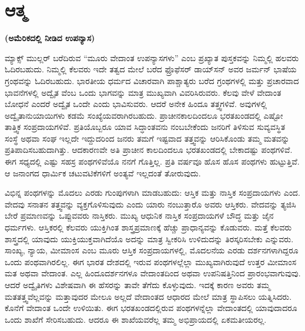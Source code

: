 \chapter{ಆತ್ಮ}

\centerline{\textbf{(ಅಮೆರಿಕದಲ್ಲಿ ನೀಡಿದ ಉಪನ್ಯಾಸ)}}

ಮ್ಯಾಕ್ಸ್​ ಮುಲ್ಲರ್​ ಬರೆದಿರುವ “ಮೂರು ವೇದಾಂತ ಉಪನ್ಯಾಸಗಳು” ಎಂಬ ಪ್ರಖ್ಯಾತ ಪುಸ್ತಕವನ್ನು ನಿಮ್ಮಲ್ಲಿ ಹಲವರು ಓದಿರಬಹುದು. ನಿಮ್ಮಲ್ಲಿ ಕೆಲವರು ಇದೇ ತತ್ವದ ಮೇಲೆ ಬರೆದ ಫ್ರೊಫೆಸರ್​ ಡಾಯ್​ಸನ್​ ಅವರ ಜರ್ಮನ್​ ಭಾಷೆಯ ಗ್ರಂಥವನ್ನು ಓದಿರಬಹುದು. ಭಾರತೀಯ ಧರ್ಮದ ವಿಚಾರವಾಗಿ ಪಾಶ್ಚಾತ್ಯರು ಬರೆದ ಗ್ರಂಥಗಳಲ್ಲಿ ಮತ್ತು ಪ್ರಚಾರವಾದ ಭಾವನೆಗಳಲ್ಲಿ ಅದ್ವೈತ ವೆಂಬ ಒಂದು ಭಾಗವನ್ನು ಮಾತ್ರ ಮುಖ್ಯವಾಗಿ ವಿವರಿಸಿರುವರು. ಕೆಲವು ವೇಳೆ ವೇದಾಂತ ಬೋಧನೆ ಎಂದರೆ ಅದ್ವೈತ ಒಂದೇ ಎಂದು ಭಾವಿಸುವರು. ಆದರೆ ಅನೇಕ ಹಿಂದೂ ತತ್ತ್ವಗಳಿವೆ. ಅವುಗಳಲ್ಲಿ ಅದ್ವೈತಾನುಯಾಯಿಗಳು ಕಡಮೆ ಸಂಖ್ಯೆಯವರಾಗಿರಬಹುದು. ಪ್ರಾಚೀನಕಾಲದಿಂದಲೂ ಭರತಖಂಡದಲ್ಲಿ ಎಷ್ಟೋ ತಾತ್ತ್ವಿಕ ಸಂಪ್ರದಾಯಗಳಿವೆ. ಪ್ರತಿಯೊಬ್ಬರೂ ಯಾವ ಸಿದ್ಧಾಂತವನು ನಂಬಬೇಕೆಂದು ಜನರಿಗೆ ತಿಳಿಸುವ ಸುವ್ಯವಸ್ಥಿತ ಸಂಸ್ಥೆ ಅಥವಾ ಸಂಘ ಇಲ್ಲದೇ ಇದ್ದುದರಿಂದ ಜನರು ತಮಗೆ ಇಷ್ಟವಾದ ತತ್ತ್ವವನ್ನು ಆರಿಸಿಕೊಂಡು ತಮ್ಮ ಮತವನ್ನು ಪ್ರತಿಪಾದಿಸಬಹುದಾಗಿತ್ತು. ಆದಕಾರಣವೇ ಅತಿ ಪ್ರಾಚೀನ ಕಾಲದಿಂದಲೂ ಭರತಖಂಡದಲ್ಲಿ ಬೇಕಾದಷ್ಟು ಪಂಥಗಳಿವೆ. ಈಗ ಸಧ್ಯದಲ್ಲಿ ಎಷ್ಟು ಸಹಸ್ರ ಪಂಥಗಳಿವೆಯೊ ನನಗೆ ಗೊತ್ತಿಲ್ಲ. ಪ್ರತಿ ವರ್ಷವೂ ಹೊಸ ಹೊಸ ಪಂಥಗಳು ಹುಟ್ಟುತ್ತಿವೆ. ಆ ಜನಾಂಗದ ಧಾರ್ಮಿಕ ಚಟುವಟಿಕೆಗಳಿಗೆ ಅಂತ್ಯವೆ ಇಲ್ಲದಂತೆ ತೋರುವುದು.

\vskip 0.3cm

ವಿಭಿನ್ನ ಪಂಥಗಳನ್ನು ಮೊದಲು ಎರಡು ಗುಂಪುಗಳಾಗಿ ಮಾಡಬಹುದು: ಆಸ್ತಿಕ ಮತ್ತು ನಾಸ್ತಿಕ ಸಂಪ್ರದಾಯಗಳು ಎಂದ. ವೇದವು ಸನಾತನ ತತ್ತ್ವವನ್ನು ವ್ಯಕ್ತಗೊಳಿಸುವುದು ಎಂದು ಯಾರು ನಂಬುತ್ತಾರೊ ಅವರು ಆಸ್ತಿಕರು. ವೇದವನ್ನು ತ್ಯಜಿಸಿ ಬೇರೆ ಪ್ರಮಾಣವನ್ನು ಒಪ್ಪುವವರು ನಾಸ್ತಿಕರು. ಮುಖ್ಯ ಆಧುನಿಕ ನಾಸ್ತಿಕ ಸಂಪ್ರದಾಯಗಳೆ ಬೌದ್ಧ ಮತ್ತು ಜೈನ ಧರ್ಮಗಳು. ಆಸ್ತಿಕರಲ್ಲಿ ಕೆಲವರು ಯುಕ್ತಿಗಿಂತ ಶಾಸ್ತ್ರಪ್ರಮಾಣಕ್ಕೆ ಹೆಚ್ಚು ಪ್ರಾಧಾನ್ಯವನ್ನು ಕೊಡುವರು. ಮತ್ತೆ ಕೆಲವರು ಶಾಸ್ತ್ರದಲ್ಲಿ ಯಾವುದು ಯುಕ್ತಿಯುಕ್ತವಾಗಿದೆಯೊ ಅದನ್ನು ಮಾತ್ರ ಸ್ವೀಕರಿಸಿ ಉಳಿದುದನ್ನು ತಿರಸ್ಕರಿಸಬೇಕು ಎನ್ನುವರು. ಸಾಂಖ್ಯ, ನ್ಯಾಯ, ಮೀಮಾಂಸ ಎಂಬ ಮೂರು ಆಸ್ತಿಕ ಸಂಪ್ರದಾಯಗಳಲ್ಲಿ, ಮೊದಲನೆಯ ಎರಡು ದರ್ಶನಗಳಾಗಿದ್ದರೂ ಒಂದು ಪಂಥವಾಗಿರಲಿಲ್ಲ. ಈಗ ಭಾರತ ದೇಶದಲ್ಲಿ ಇರುವ ಪಂಥಗಳಲ್ಲೆಲ್ಲಾ ಮುಖ್ಯವಾಗಿರುವುದೆ ಉತ್ತರ ಮೀಮಾಂಸ ಮತ ಅಥವಾ ವೇದಾಂತ. ಎಲ್ಲ ಹಿಂದೂದರ್ಶನಗಳೂ ವೇದಾಂತದಿಂದ ಅಥವಾ ಉಪನಿಷತ್ತಿನಿಂದ ಪ್ರಾರಂಭವಾಗುವುವು. ಆದರೆ ಅದ್ವೈತಿಗಳು ವಿಶೇಷವಾಗಿ ಈ ಹೆಸರನ್ನು ತಾವೇ ತೆಗೆದು ಕೊಳ್ಳುವುದು. ಇದಕ್ಕೆ ಕಾರಣ ಅವರು ತಮ್ಮ ಮತತತ್ತ್ವವೆಲ್ಲವನ್ನು ಮತ್ತಾವುದರ ಮೇಲೂ ಅಲ್ಲದೆ ವೇದಾಂತದ ಆಧಾರದ ಮೇಲೆ ಮಾತ್ರ ಸ್ಥಾಪಿಸಲು ಯತ್ನಿಸಿದರು. ಕೊನೆಗೆ ವೇದಾಂತ ಒಂದೇ ಉಳಿಯಿತು. ಈಗ ಭರತಖಂಡದಲ್ಲಿರುವ ಪಂಥಗಳನ್ನೆಲ್ಲಾ ವೇದಾಂತದಲ್ಲಿ ಯಾವುದಾದರೂ ಒಂದು ಶಾಖೆಗೆ ಸೇರಿಸಬಹುದು. ಆದರೂ ಈ ಶಾಖೆಯವರೆಲ್ಲ ತಮ್ಮ ಅಭಿಪ್ರಾಯದಲ್ಲಿ ಏಕಮತೀಯರಲ್ಲ.



